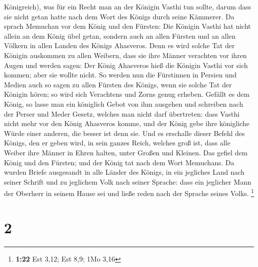 Königreich),  was für ein Recht man an der Königin Vasthi
tun sollte, darum dass sie nicht getan hatte nach dem Wort des Königs
durch seine Kämmerer.  Da sprach Memuchan vor dem König und
den Fürsten: Die Königin Vasthi hat nicht allein an dem König übel
getan, sondern auch an allen Fürsten und an allen Völkern in allen
Landen des Königs Ahasveros.  Denn es wird solche Tat der
Königin auskommen zu allen Weibern, dass sie ihre Männer verachten vor
ihren Augen und werden sagen: Der König Ahasveros hieß die Königin
Vasthi vor sich kommen; aber sie wollte nicht.  So werden
nun die Fürstinnen in Persien und Medien auch so sagen zu allen Fürsten
des Königs, wenn sie solche Tat der Königin hören; so wird sich
Verachtens und Zorns genug erheben.  Gefällt es dem König,
so lasse man ein königlich Gebot von ihm ausgehen und schreiben nach der
Perser und Meder Gesetz, welches man nicht darf übertreten: dass Vasthi
nicht mehr vor den König Ahasveros komme, und der König gebe ihre
königliche Würde einer anderen, die besser ist denn sie. 
Und es erschalle dieser Befehl des Königs, den er geben wird, in sein
ganzes Reich, welches groß ist, dass alle Weiber ihre Männer in Ehren
halten, unter Großen und Kleinen.  Das gefiel dem König und
den Fürsten; und der König tat nach dem Wort Memuchans.  Da
wurden Briefe ausgesandt in alle Länder des Königs, in ein jegliches
Land nach seiner Schrift und zu jeglichem Volk nach seiner Sprache: dass
ein jeglicher Mann der Oberherr in seinem Hause sei und ließe reden nach
der Sprache seines Volks. \footnote{\textbf{1:22} Est 3,12; Est 8,9; 1Mo
  3,16}

\hypertarget{section-1}{%
\section{2}\label{section-1}}

